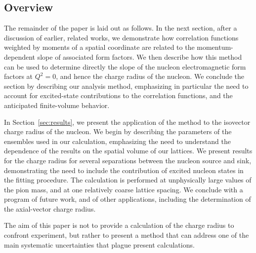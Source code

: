\documentclass[prd,aps,twocolumn,superscriptaddress,tightenlines,nofootinbib,floatfix,preprintnumbers,10pt]{revtex4-1}
\begin{document}
\subsection{Overview}

The remainder of the paper is laid out as follows.  In the next
section, after a discussion of earlier, related works, we demonstrate
how correlation functions weighted by moments of a spatial coordinate
are related to the momentum-dependent slope of associated form
factors.  We then describe how this method can be used to determine
directly the slope of the nucleon electromagnetic form factors at $Q^2
= 0$, and hence the charge radius of the nucleon.  We conclude the
section by describing our analysis method, emphasizing in particular the need
to account for excited-state contributions to the correlation
functions, and the anticipated finite-volume behavior.

In Section~\ref{sec:results}, we present the application of the method
to the isovector charge radius of the nucleon.  We begin by describing
the parameters of the ensembles used in our calculation, emphasizing
the need to understand the dependence of the results on the spatial
volume of our lattices.  We present results for the charge radius for
several separations between the nucleon source and sink, demonstrating
the need to include the contribution of excited nucleon states in the
fitting procedure.  The calculation is performed at unphysically large
values of the pion mass, and at one relatively coarse lattice spacing.
We conclude with a program of future work, and of other applications,
including the determination of the axial-vector charge radius.

The aim of this paper is not to provide a calculation of the charge
radius to confront experiment, but rather to present a method that can
address one of the main systematic uncertainties that plague present
calculations.
\end{document}
